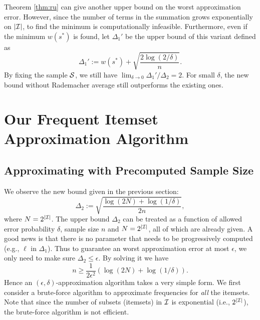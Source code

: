 \documentclass{article}
\begin{document}
Theorem \ref{thm:ru} can give another upper bound on the worst approximation error. However, since the number of terms in the summation grows exponentially on $|\mathcal{I}|$, to find the minimum is computationally infeasible. Furthermore, even if the minimum $w(s^*)$ is found, let $\Delta_1'$ be the upper bound of this variant defined as 
$$\Delta_1' := w(s^*) + \sqrt{\frac{2\log(2/\delta)}{n}}.$$
By fixing the sample $\mathcal{S}$, we still have $\lim_{\delta\to 0}\Delta_1'/\Delta_2 = 2$. For small $\delta$, the new bound without Rademacher average still outperforms the existing ones.

\section{Our Frequent Itemset Approximation Algorithm}
\label{sec:algs}
\subsection{Approximating with Precomputed Sample Size}
\label{sec:nonprg}
We observe the new bound given in the previous section:
$$\Delta_2 := \sqrt{\frac{\log(2N) + \log(1/\delta)}{2n}},$$
where $N = 2^{|\mathcal{I}|}$.
The upper bound $\Delta_2$ can be treated as a function of allowed error probability $\delta$, sample size $n$ and $N = 2^{|\mathcal{I}|}$, all of which are already given. A good news is that there is no parameter that needs to be progressively computed (e.g., $\ell$ in $\Delta_1$). Thus to guarantee an worst approximation error at most $\epsilon$, we only need to make sure $\Delta_2 \leq \epsilon$. By solving it we have
$$n \geq \frac{1}{2\epsilon^2}(\log (2N) + \log (1/\delta)).$$
Hence an $(\epsilon,\delta)$-approximation algorithm takes a very simple form. We first consider a brute-force algorithm to approximate frequencies for \emph{all} the itemsets. Note that since the number of subsets (itemsets) in $\mathcal{I}$ is exponential (i.e., $2^{|\mathcal{I}|}$), the brute-force algorithm is not efficient.
\end{document}
